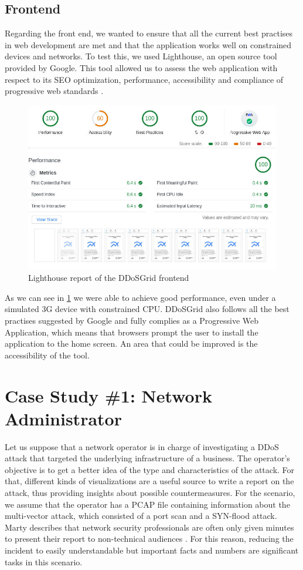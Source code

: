 \subsection{Frontend}\label{frontendevaluation}
Regarding the front end, we wanted to ensure that all the current best practises in web development are met and that the application works well on constrained devices and networks. To test this, we used Lighthouse, an open source tool provided by Google. This tool allowed us to assess the web application with respect to its SEO optimization, performance, accessibility and compliance of progressive web standards \cite{lighthouse}.
\begin{figure}
    \centering
    \includegraphics[width=12cm]{images/lighthouse.jpeg}
    \caption{Lighthouse report of the DDoSGrid frontend}
    \label{fig:lightouse}
\end{figure}
As we can see in \ref{fig:lightouse} we were able to achieve good performance, even under a simulated 3G device with constrained CPU. DDoSGrid also follows all the best practises suggested by Google and fully complies as a Progressive Web Application, which means that browsers prompt the user to install the application to the home screen. An area that could be improved is the accessibility of the tool.

\section{Case Study \#1: Network Administrator}
Let us suppose that a network operator is in charge of investigating a DDoS attack that targeted the underlying infrastructure of a business. The operator's objective is to get a better idea of the type and characteristics of the attack. For that, different kinds of visualizations are a useful source to write a report on the attack, thus providing insights about possible countermeasures. For the scenario, we assume that the operator has a PCAP file containing information about the multi-vector attack, which consisted of a port scan and a SYN-flood attack. Marty describes that network security professionals are often only given minutes to present their report to non-technical audiences \cite{appliedsecurityvisualization}. For this reason, reducing the incident to easily understandable but important facts and numbers are significant tasks in this scenario.

